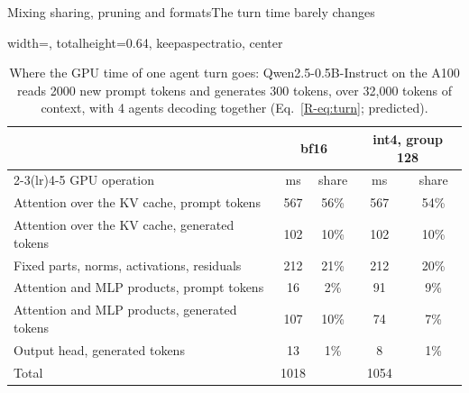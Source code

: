 \documentclass[aspectratio=169,10pt]{beamer}
\begin{document}
\begin{frame}{Mixing sharing, pruning and formats}{The turn time barely changes}
\begin{table}
\centering
\begin{adjustbox}{width=\linewidth, totalheight=0.64\textheight, keepaspectratio, center}
\centering
\small
\begin{tabular}{lcccc}
\toprule
& \multicolumn{2}{c}{bf16} & \multicolumn{2}{c}{int4, group 128} \\
\cmidrule(lr){2-3}\cmidrule(lr){4-5}
GPU operation & ms & share & ms & share \\
\midrule
Attention over the KV cache, prompt tokens        & 567  & 56\% & 567  & 54\% \\
Attention over the KV cache, generated tokens     & 102  & 10\% & 102  & 10\% \\
Fixed parts, norms, activations, residuals        & 212  & 21\% & 212  & 20\% \\
Attention and MLP products, prompt tokens         & 16   & 2\%  & 91   & 9\%  \\
Attention and MLP products, generated tokens      & 107  & 10\% & 74   & 7\%  \\
Output head, generated tokens                     & 13   & 1\%  & 8    & 1\%  \\
\midrule
Total                                             & 1018 &      & 1054 &      \\
\bottomrule
\end{tabular}
\end{adjustbox}
\caption{Where the GPU time of one agent turn goes: Qwen2.5-0.5B-Instruct on the A100 reads 2000 new prompt
tokens and generates 300 tokens, over 32{,}000 tokens of context, with 4 agents decoding together
(Eq.~\ref{R-eq:turn}; predicted).}\label{tab:turn}
\end{table}
\end{frame}
\end{document}
